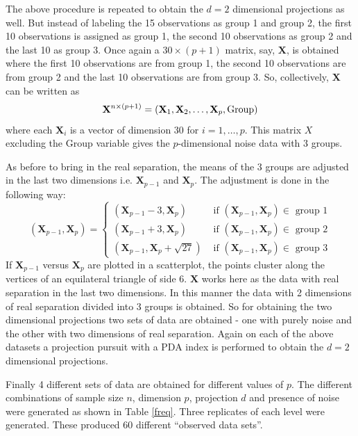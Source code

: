 The above procedure is repeated to obtain the $d = 2$ dimensional projections as well. But instead of labeling the 15 observations as group 1 and group 2, the first 10 observations is assigned as group 1, the second 10 observations as group 2 and the last 10 as group 3. Once again a $30 \times (p + 1)$ matrix, say, $ \mathbf{X}$, is obtained where the first 10 observations are from group 1, the second 10 observations are from group 2 and the last 10 observations are from group 3.  So, collectively,  $\mathbf{X}$ can be written as
$$ \mathbf{X}^{n \times (p + 1)} = ( \mathbf{X}_1,  \mathbf{X}_2, \dots, \mathbf{X}_p, \hbox{Group})$$ where each $ \mathbf{X}_i$ is a vector of dimension 30 for $i = 1, \dots, p$. This matrix $X$ excluding the Group variable gives the $p$-dimensional noise data with 3 groups.

As before to bring in the real separation, the means of the 3 groups are adjusted in the last two dimensions i.e. $ \mathbf{X}_{p-1}$ and $ \mathbf{X}_p$. The adjustment is done in the following way:
$$
( \mathbf{X}_{p-1},  \mathbf{X}_p) = \left\{ \begin{array}{rl}
 ( \mathbf{X}_{p-1} - 3,  \mathbf{X}_p) &\mbox{ if $( \mathbf{X}_{p-1},  \mathbf{X}_p) \in$ group 1} \\
 ( \mathbf{X}_{p-1} + 3,  \mathbf{X}_p) &\mbox{ if $( \mathbf{X}_{p-1},  \mathbf{X}_p) \in$ group 2} \\
 ( \mathbf{X}_{p-1} ,  \mathbf{X}_p + \sqrt{27}) &\mbox{ if $( \mathbf{X}_{p-1},  \mathbf{X}_p) \in$ group 3}
       \end{array} \right.
$$
If $ \mathbf{X}_{p-1}$ versus $ \mathbf{X}_p$ are plotted in a scatterplot, the points cluster along the vertices of an equilateral triangle of side 6. $ \mathbf{X}$ works here as the data with real separation in the last two dimensions. In this manner the data with 2 dimensions of real separation divided into 3 groups is obtained. 
So for obtaining the two dimensional projections two sets of data are obtained - one with purely noise and the other with two dimensions of real separation. Again on each of the above datasets a projection pursuit with a PDA index is performed to obtain the $d = 2$ dimensional projections. 

Finally 4 different sets of data are obtained for different values of $p$. The different combinations of sample size $n$, dimension $p$, projection $d$ and presence of noise were generated as shown in Table \ref{freq}. Three replicates of each level were generated. These produced 60 different ``observed data sets''. 

